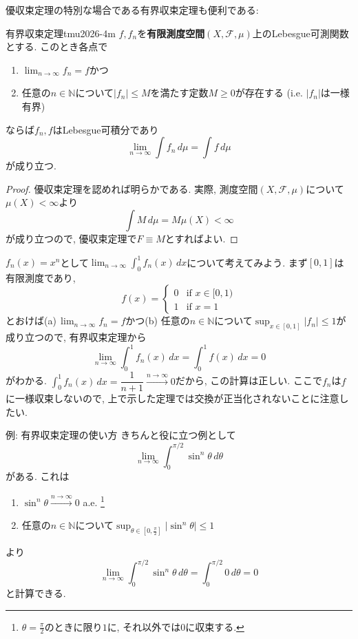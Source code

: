 \documentclass[titlepage]{jsarticle}
\numberwithin{equation}{section}
\newcommand{\N}{\mathbb{N}}%
\begin{document}
優収束定理の特別な場合である有界収束定理も便利である:
\begin{thm}{有界収束定理}{tmu2026-4m}
$f, f_n$を\textbf{有限測度空間}$(X, \mathcal{F}, \mu)$上のLebesgue可測関数とする. このとき各点で
\begin{enumerate}[label=(\alph*)]
\item $\displaystyle{\lim_{n \to \infty} f_n = f}$かつ
\item 任意の$n \in \N$について$|f_n| \le M$を満たす定数$M \ge 0$が存在する (i.e. $|f_n|$は一様有界)
\end{enumerate}
ならば$f_n, f$はLebesgue可積分であり
\[
\lim_{n \to \infty} \int f_n\,d\mu = \int f\,d\mu
\]
が成り立つ. 
\end{thm}
\begin{proof}
優収束定理を認めれば明らかである. 実際, 測度空間$(X, \mathcal{F}, \mu)$について$\mu(X) < \infty$より
\[
\int M\,d\mu = M\mu(X) < \infty
\]
が成り立つので, 優収束定理で$F \equiv M$とすればよい.
\end{proof}
$f_n(x) = x^n$として$\displaystyle{\lim_{n \to  \infty} \int_0^1 f_n(x)\,dx}$について考えてみよう. まず$[0, 1]$は有限測度であり, 
\[
f(x) = 
\begin{cases}
0 & \text{if}\,\,x \in [0, 1)\\
1 & \text{if}\,\,x = 1
\end{cases}
\]
とおけば(a)\,$\displaystyle{\lim_{n \to \infty}f_n = f}$かつ(b) 任意の$n \in \N$について$\displaystyle{\sup_{x \in [0, 1]}|f_n| \le 1}$が成り立つので, 有界収束定理から
\[
\lim_{n \to \infty}\int_0^1 f_n(x)\,dx = \int_0^1 f(x)\,dx = 0
\]
がわかる. $\displaystyle{\int_0^1 f_n(x)\,dx = \dfrac{1}{n + 1}} \stackrel{n \to \infty}{\longrightarrow} 0$だから, この計算は正しい. ここで$f_n$は$f$に一様収束しないので, 上で示した定理では交換が正当化されないことに注意したい.
\begin{ex}{例: 有界収束定理の使い方}
きちんと役に立つ例として
\[
\lim_{n \to \infty}\int_0^{\pi/2}\sin^n\theta\,d\theta
\]がある. これは
\begin{enumerate}[label=(\alph*)]
\item $\sin^n\theta \stackrel{n \to \infty}{\longrightarrow} 0$\,\,a.e. \footnote{$\theta = \frac{\pi}{2}$のときに限り$1$に, それ以外では$0$に収束する.}
\item 任意の$n\in\N$について$\displaystyle{\sup_{\theta \in [0, \frac{\pi}{2}]}|\sin^n\theta| \le 1}$
\end{enumerate}
より
\[
\lim_{n \to \infty}\int_0^{\pi/2}\sin^n\theta\,d\theta = \int_0^{\pi/2} 0\,d\theta = 0
\]
と計算できる.
\end{ex}
\end{document}
